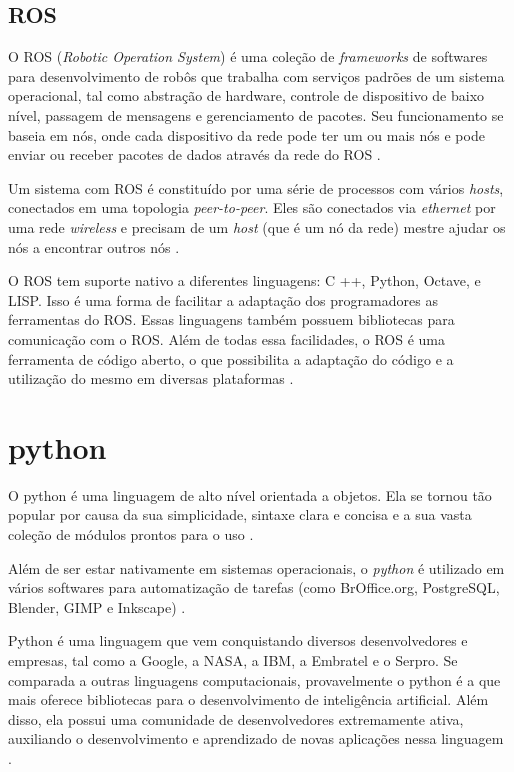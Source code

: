 \subsection{ROS}

O ROS (\textit{Robotic Operation System}) é uma coleção de \textit{frameworks} de softwares para desenvolvimento de robôs que trabalha com serviços padrões de um sistema operacional, tal como abstração de hardware, controle de dispositivo de baixo nível, passagem de mensagens e gerenciamento de pacotes. Seu funcionamento se baseia em nós, onde cada dispositivo da rede pode ter um ou mais nós e pode enviar ou receber pacotes de dados através da rede do ROS  \cite{ros}.

Um sistema com ROS é constituído por uma série de processos com vários \textit{hosts}, conectados em uma topologia \textit{peer-to-peer}. Eles são conectados via \textit{ethernet} por uma rede \textit{wireless} e precisam de um \textit{host} (que é um nó da rede) mestre ajudar os nós a encontrar outros nós \cite{Ros2}.

O ROS tem suporte nativo a diferentes linguagens:  C ++, Python, Octave, e LISP. Isso é uma forma de facilitar a adaptação dos programadores as ferramentas do ROS. Essas linguagens também possuem bibliotecas para comunicação com o ROS. Além de todas essa facilidades, o ROS é uma ferramenta de código aberto, o que possibilita a adaptação do código e a utilização do mesmo em diversas plataformas \cite{Ros2}.

\section{python}
\label{sec:python}

O python é uma linguagem de alto nível orientada a objetos. Ela se tornou tão popular por causa da sua simplicidade, sintaxe clara e concisa e a sua vasta coleção de módulos prontos para o uso \cite{borges2014python}. 

Além de ser estar nativamente em sistemas operacionais, o \textit{python} é utilizado em vários softwares para automatização de tarefas (como BrOffice.org, PostgreSQL, Blender, GIMP e Inkscape) \cite{borges2014python}. 

Python é uma linguagem que vem conquistando diversos desenvolvedores e empresas, tal como a Google, a NASA, a IBM, a Embratel e o Serpro. Se comparada a outras linguagens computacionais, provavelmente o python é a que mais oferece bibliotecas para o desenvolvimento de inteligência artificial. Além disso, ela possui uma comunidade de desenvolvedores extremamente ativa, auxiliando o desenvolvimento e aprendizado de novas aplicações nessa linguagem \cite{jonasgranatyr}. 

